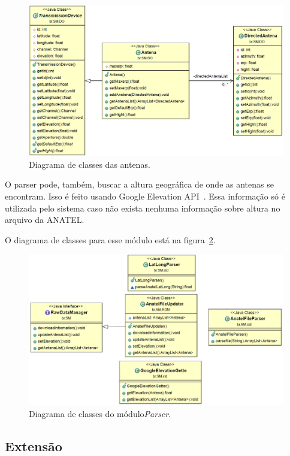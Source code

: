 \begin{figure}[htb]
\centering
\includegraphics[width=1.0\textwidth]{figs/antena}
\caption[\textit{Antena}.]
{Diagrama de classes das antenas.}
\label{fig:antena}
\end{figure} 

O parser pode, também, buscar a altura geográfica de onde as antenas se encontram. Isso é feito usando Google Elevation API~\cite{elevation}. Essa informação só é utilizada pelo sistema caso não exista nenhuma informação sobre altura no arquivo da ANATEL.

O diagrama de classes para esse módulo está na figura~\ref{fig:RDM}.

\begin{figure}[htb]
\centering
\includegraphics[width=1.0\textwidth]{figs/rdm}
\caption[\textit{Parser}.]
{Diagrama de classes do módulo\textit{Parser}.}
\label{fig:RDM}
\end{figure}



\subsection{Extensão}

